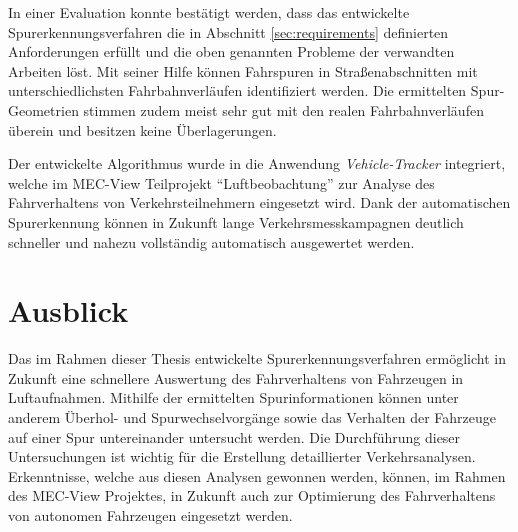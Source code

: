 In einer Evaluation konnte bestätigt werden, dass das entwickelte Spurerkennungsverfahren die in Abschnitt
\ref{sec:requirements} definierten Anforderungen erfüllt und die oben genannten Probleme der verwandten Arbeiten löst.
Mit seiner Hilfe können Fahrspuren in Straßenabschnitten mit unterschiedlichsten Fahrbahnverläufen identifiziert werden.
Die ermittelten Spur-Geometrien stimmen zudem meist sehr gut mit den realen Fahrbahnverläufen überein
und besitzen keine Überlagerungen.

Der entwickelte Algorithmus wurde in die Anwendung \textit{Vehicle-Tracker} integriert,
welche im MEC-View Teilprojekt ``Luftbeobachtung'' zur Analyse des Fahrverhaltens von Verkehrsteilnehmern
eingesetzt wird. Dank der automatischen Spurerkennung können in Zukunft lange Verkehrsmesskampagnen deutlich
schneller und nahezu vollständig automatisch ausgewertet werden.


\section{Ausblick}

Das im Rahmen dieser Thesis entwickelte Spurerkennungsverfahren ermöglicht in Zukunft eine schnellere Auswertung
des Fahrverhaltens von Fahrzeugen in Luftaufnahmen. Mithilfe der ermittelten Spurinformationen können
unter anderem Überhol- und Spurwechselvorgänge sowie das Verhalten der Fahrzeuge auf einer Spur
untereinander untersucht werden. Die Durchführung dieser Untersuchungen ist wichtig für die Erstellung
detaillierter Verkehrsanalysen. Erkenntnisse, welche aus diesen Analysen gewonnen werden, können, im
Rahmen des MEC-View Projektes, in Zukunft auch zur Optimierung des Fahrverhaltens von autonomen
Fahrzeugen eingesetzt werden.

